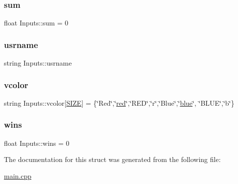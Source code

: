\subsubsection{\texorpdfstring{sum}{sum}}
{\footnotesize\ttfamily float Inputs\+::sum = 0}

\mbox{\label{struct_inputs_a890a399e0575f0ab410e101f3748d04a}} 
\subsubsection{\texorpdfstring{usrname}{usrname}}
{\footnotesize\ttfamily string Inputs\+::usrname}

\mbox{\label{struct_inputs_a80018d9bf94a9c6ea573b93ed30f89a6}} 
\subsubsection{\texorpdfstring{vcolor}{vcolor}}
{\footnotesize\ttfamily string Inputs\+::vcolor\mbox{[}\hyperlink{main_8cpp_af08413a3ee12cf78b0ddeea71e2648b3}{S\+I\+ZE}\mbox{]} = \{\char`\"{}Red\char`\"{},\char`\"{}\hyperlink{struct_inputs_a7e6f084b57b2515a6d260d422b252f37}{red}\char`\"{},\char`\"{}R\+ED\char`\"{},\char`\"{}r\char`\"{},\char`\"{}Blue\char`\"{},\char`\"{}\hyperlink{struct_inputs_a685a6f5b41c965ecc2ff5ede529649da}{blue}\char`\"{}, \char`\"{}B\+L\+UE\char`\"{},\char`\"{}b\char`\"{}\}}

\mbox{\label{struct_inputs_a29b8137642d1269f9ef32b785200c17c}} 
\subsubsection{\texorpdfstring{wins}{wins}}
{\footnotesize\ttfamily float Inputs\+::wins = 0}



The documentation for this struct was generated from the following file\+:\begin{DoxyCompactItemize}
\item 
\hyperlink{main_8cpp}{main.\+cpp}\end{DoxyCompactItemize}
